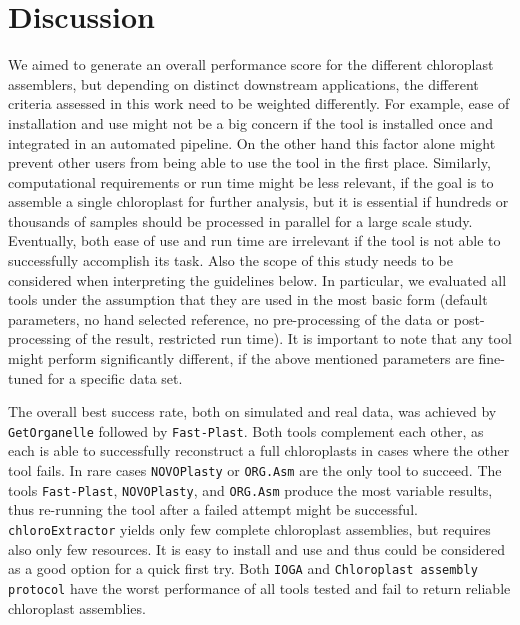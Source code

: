 \documentclass{bmcart}
\newcommand{\formatprogramnames}[1]{\texttt{#1}}
\newcommand{\ce}{\formatprogramnames{chloroExtractor}}
\newcommand{\oa}{\formatprogramnames{ORG.Asm}}
\newcommand{\fp}{\formatprogramnames{Fast-Plast}}
\newcommand{\ioga}{\formatprogramnames{IOGA}}
\newcommand{\np}{\formatprogramnames{NOVOPlasty}}
\newcommand{\go}{\formatprogramnames{GetOrganelle}}
\newcommand{\cassp}{\formatprogramnames{Chloroplast assembly protocol}}
\begin{document}
\section*{Discussion}
We aimed to generate an overall performance score for the different chloroplast assemblers, but depending on distinct downstream applications, the different criteria assessed in this work need to be weighted differently.
For example, ease of installation and use might not be a big concern if the tool is installed once and integrated in an automated pipeline. On the other hand this factor alone might prevent other users from being able to use the tool in the first place.
Similarly, computational requirements or run time might be less relevant, if the goal is to assemble a single chloroplast for further analysis, but it is essential if hundreds or thousands of samples should be processed in parallel for a large scale study.
Eventually, both ease of use and run time are irrelevant if the tool is not able to successfully accomplish its task.
Also the scope of this study needs to be considered when interpreting the guidelines below.
In particular, we evaluated all tools under the assumption that they are used in the most basic form (default parameters, no hand selected reference, no pre-processing of the data or post-processing of the result, restricted run time).
It is important to note that any tool might perform significantly different, if the above mentioned parameters are fine-tuned for a specific data set.

The overall best success rate, both on simulated and real data, was achieved by \go{} followed by \fp{}.
Both tools complement each other, as each is able to successfully reconstruct a full chloroplasts in cases where the other tool fails. 
In rare cases \np{} or \oa{} are the only tool to succeed.
The tools \fp{}, \np{}, and \oa{} produce the most variable results, thus re-running the tool after a failed attempt might be successful.
\ce{} yields only few complete chloroplast assemblies, but requires also only few resources.
It is easy to install and use and thus could be considered as a good option for a quick first try.
Both \ioga{} and \cassp{} have the worst performance of all tools tested and fail to return reliable chloroplast assemblies.
\end{document}
